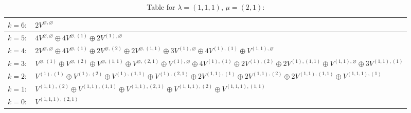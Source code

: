 \renewcommand{\arraystretch}{1.6} 
\begin{table}[H]
\centering
\caption{Table for $\lambda = (1, 1, 1)$, $\mu = (2, 1)$:}
\begin{tabular}{|>{\centering\arraybackslash}p{15cm}|}
\hline
 $k = 6: \quad 2 V^{\varnothing, \varnothing} $ \\ \hline
 $k = 5: \quad 4 V^{\varnothing, \varnothing} \oplus 4 V^{\varnothing, (1)} \oplus 2 V^{(1), \varnothing} $ \\ \hline
 $k = 4: \quad 2 V^{\varnothing, \varnothing} \oplus 4 V^{\varnothing, (1)} \oplus 2 V^{\varnothing, (2)} \oplus 2 V^{\varnothing, (1, 1)} \oplus 3 V^{(1), \varnothing} \oplus 4 V^{(1), (1)} \oplus V^{(1, 1), \varnothing} $ \\ \hline
 $k = 3: \quad V^{\varnothing, (1)} \oplus V^{\varnothing, (2)} \oplus V^{\varnothing, (1, 1)} \oplus V^{\varnothing, (2, 1)} \oplus V^{(1), \varnothing} \oplus 4 V^{(1), (1)} \oplus 2 V^{(1), (2)} \oplus 2 V^{(1), (1, 1)} \oplus V^{(1, 1), \varnothing} \oplus 3 V^{(1, 1), (1)} $ \\ \hline
 $k = 2: \quad V^{(1), (1)} \oplus V^{(1), (2)} \oplus V^{(1), (1, 1)} \oplus V^{(1), (2, 1)} \oplus 2 V^{(1, 1), (1)} \oplus 2 V^{(1, 1), (2)} \oplus 2 V^{(1, 1), (1, 1)} \oplus V^{(1, 1, 1), (1)} $ \\ \hline
 $k = 1: \quad V^{(1, 1), (2)} \oplus V^{(1, 1), (1, 1)} \oplus V^{(1, 1), (2, 1)} \oplus V^{(1, 1, 1), (2)} \oplus V^{(1, 1, 1), (1, 1)} $ \\ \hline
 $k = 0: \quad V^{(1, 1, 1), (2, 1)} $ \\ \hline
\end{tabular}
\end{table}

